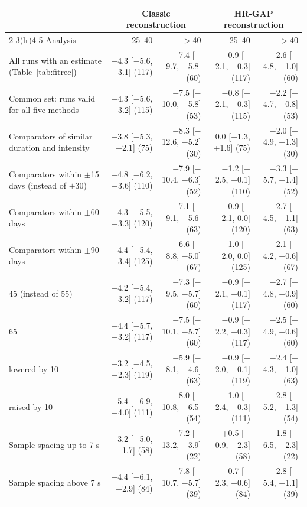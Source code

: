 \begin{tabular}{@{}lrrrr@{}}
\toprule
 & \multicolumn{2}{c}{Classic reconstruction} & \multicolumn{2}{c}{HR-GAP reconstruction} \\ \cmidrule(lr){2-3}\cmidrule(lr){4-5}
Analysis & 25--40 & $>$40 & 25--40 & $>$40 \\
\midrule
All runs with an estimate (Table~\ref{tab:fitrec}) & $-$4.3 [$-$5.6, $-$3.1] (117) & $-$7.4 [$-$9.7, $-$5.8] (60) & $-$0.9 [$-$2.1, +0.3] (117) & $-$2.6 [$-$4.8, $-$1.0] (60) \\
Common set: runs valid for all five methods & $-$4.3 [$-$5.6, $-$3.2] (115) & $-$7.5 [$-$10.0, $-$5.8] (53) & $-$0.8 [$-$2.1, +0.3] (115) & $-$2.2 [$-$4.7, $-$0.8] (53) \\
Comparators of similar duration and intensity & $-$3.8 [$-$5.3, $-$2.1] (75) & $-$8.3 [$-$12.6, $-$5.2] (30) & 0.0 [$-$1.3, +1.6] (75) & $-$2.0 [$-$4.9, +1.3] (30) \\
Comparators within $\pm$15 days (instead of $\pm$30) & $-$4.8 [$-$6.2, $-$3.6] (110) & $-$7.9 [$-$10.4, $-$6.3] (52) & $-$1.2 [$-$2.5, +0.1] (110) & $-$3.3 [$-$5.7, $-$1.4] (52) \\
Comparators within $\pm$60 days & $-$4.3 [$-$5.5, $-$3.3] (120) & $-$7.1 [$-$9.1, $-$5.6] (63) & $-$0.9 [$-$2.1, 0.0] (120) & $-$2.7 [$-$4.5, $-$1.1] (63) \\
Comparators within $\pm$90 days & $-$4.4 [$-$5.4, $-$3.4] (125) & $-$6.6 [$-$8.8, $-$5.0] (67) & $-$1.0 [$-$2.0, 0.0] (125) & $-$2.1 [$-$4.2, $-$0.6] (67) \\
\addlinespace[2pt]
\HRrest{} 45 (instead of 55) & $-$4.2 [$-$5.4, $-$3.2] (117) & $-$7.3 [$-$9.5, $-$5.7] (60) & $-$0.9 [$-$2.1, +0.1] (117) & $-$2.7 [$-$4.8, $-$0.9] (60) \\
\HRrest{} 65 & $-$4.4 [$-$5.7, $-$3.2] (117) & $-$7.5 [$-$10.1, $-$5.7] (60) & $-$0.9 [$-$2.2, +0.3] (117) & $-$2.5 [$-$4.9, $-$0.6] (60) \\
\HRmax{} lowered by 10 & $-$3.2 [$-$4.5, $-$2.3] (119) & $-$5.9 [$-$8.1, $-$4.6] (63) & $-$0.9 [$-$2.0, +0.1] (119) & $-$2.4 [$-$4.3, $-$1.0] (63) \\
\HRmax{} raised by 10 & $-$5.4 [$-$6.9, $-$4.0] (111) & $-$8.0 [$-$10.8, $-$6.5] (54) & $-$1.0 [$-$2.4, +0.3] (111) & $-$2.8 [$-$5.2, $-$1.3] (54) \\
\addlinespace[2pt]
Sample spacing up to 7 s & $-$3.2 [$-$5.0, $-$1.7] (58) & $-$7.2 [$-$13.2, $-$3.9] (22) & +0.5 [$-$0.9, +2.3] (58) & $-$1.8 [$-$6.5, +2.3] (22) \\
Sample spacing above 7 s & $-$4.4 [$-$6.1, $-$2.9] (84) & $-$7.8 [$-$10.7, $-$5.7] (39) & $-$0.7 [$-$2.3, +0.6] (84) & $-$2.8 [$-$5.4, $-$1.1] (39) \\
\bottomrule
\end{tabular}
